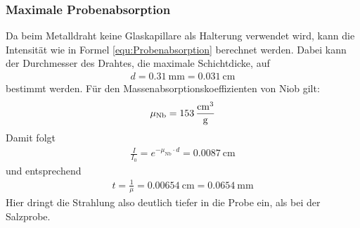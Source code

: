 \documentclass[a4paper,twoside,final]{article}
\begin{document}
\subsubsection*{Maximale Probenabsorption}
Da beim Metalldraht keine Glaskapillare als Halterung verwendet wird, kann die Intensität wie in Formel \eqref{equ:Probenabsorption} berechnet werden. Dabei kann der Durchmesser des Drahtes, die maximale Schichtdicke, auf
\begin{align}
  d = \SI{0,31}{\milli\meter}=\SI{0,031}{\centi\meter}
\end{align}
bestimmt werden. Für den Massenabsorptionskoeffizienten von Niob gilt:
\begin{align}
  \mu_\text{Nb}= \SI{153}{\frac{\centi\meter\cubed}{\gram}}
\end{align}
Damit folgt
\begin{align}
  \frac{I}{I_0}=e^{-\mu_\text{Nb}\cdot d} = \SI{0,0087}{\centi\meter}
\end{align}
und entsprechend
\begin{align}
  t = \frac{1}{\mu} = \SI{0,00654}{\centi\meter} =  \SI{0,0654}{\milli\meter}
\end{align}
Hier dringt die Strahlung also deutlich tiefer in die Probe ein, als bei der Salzprobe.
\end{document}

